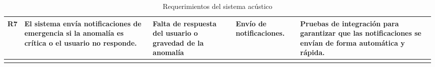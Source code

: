 {\begin{longtable}[c]{c p{3.5cm} p{2.2cm} p{2.2cm} p{3.5cm}}
            \addlinespace
            R7                     & El sistema envía notificaciones de emergencia si la anomalía es crítica o el usuario no responde.       & Falta de respuesta del usuario o gravedad de la anomalía         & Envío de notificaciones.                                              & Pruebas de integración para garantizar que las notificaciones se envían de forma automática y rápida.                                              \\
            \bottomrule
            \addlinespace

            \caption{Requerimientos del sistema acústico}
            \label{tab:requerimientos_sistema_acustico}
      \end{longtable}
}

